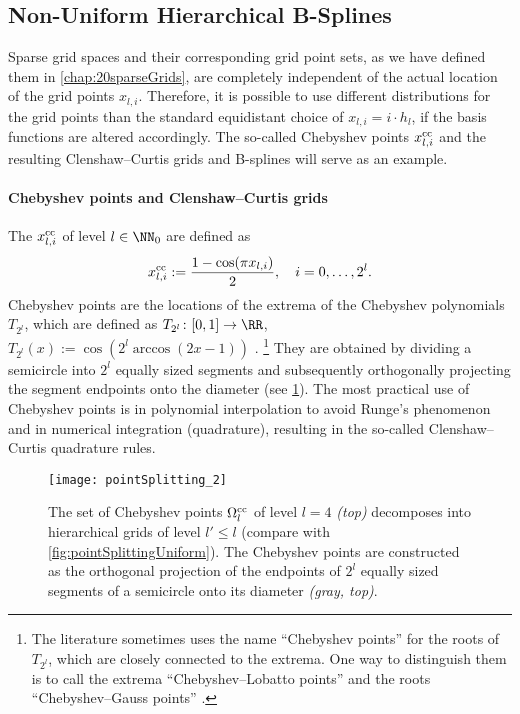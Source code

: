 \subsection{Non-Uniform Hierarchical B-Splines}

Sparse grid spaces and their corresponding grid point sets,
as we have defined them in \cref{chap:20sparseGrids},
are completely independent of the actual location of the grid points
$x_{l,i}$.
Therefore, it is possible to use different distributions for the grid points
than the standard equidistant choice of $x_{l,i} = i \cdot h_l$,
if the basis functions are altered accordingly.
The so-called Chebyshev points $x_{l,i}^{\mathrm{cc}}$ and the
resulting Clenshaw--Curtis grids and B-splines will serve as an example.

\paragraph{Chebyshev points and Clenshaw--Curtis grids}

%
The  $x_{l,i}^{\mathrm{cc}}$ of level $l \in \NN_0$
are defined as
\begin{equation}
  x_{l,i}^{\mathrm{cc}}
  := \frac{1 - \cos(\pi x_{l,i})}{2},\quad
  i = 0, \dotsc, 2^l.
\end{equation}
Chebyshev points are the locations of the extrema of the
Chebyshev polynomials $T_{2^l}$, which are defined as
$T_{2^l}\colon [0, 1] \to \RR$,
$T_{2^l}(x) := \cos(2^l \arccos(2x - 1))$ \cite{Xu16Chebyshev}.%
\footnote{%
  The literature sometimes uses the name ``Chebyshev points'' for
  the roots of $T_{2^l}$, which are closely connected to the extrema.
  One way to distinguish them is to call the extrema
  ``Chebyshev--Lobatto points'' and the roots
  ``Chebyshev--Gauss points'' \cite{Xu16Chebyshev}.%
}
They are obtained by dividing a semicircle into $2^l$ equally sized
segments and subsequently orthogonally projecting the
segment endpoints onto the diameter
(see \cref{fig:pointSplittingChebyshev}).
The most practical use of Chebyshev points is in
polynomial interpolation to avoid Runge's phenomenon and in
numerical integration (quadrature), resulting in the
so-called Clenshaw--Curtis quadrature rules.

\begin{figure}
  \texttt{[image: pointSplitting\_2]}%
  \caption{%
    The set of Chebyshev points $\Omega_l^{\mathrm{cc}}$ of level
    $l = 4$ \emph{(top)}
    decomposes into hierarchical grids of level $l' \le l$
    (compare with \cref{fig:pointSplittingUniform}).
    The Chebyshev points are constructed as
    the orthogonal projection of the
    endpoints of $2^l$ equally sized segments
    of a semicircle onto its diameter \emph{\textcolor{C8}{(gray, top)}}.%
  }
  \label{fig:pointSplittingChebyshev}
\end{figure}

